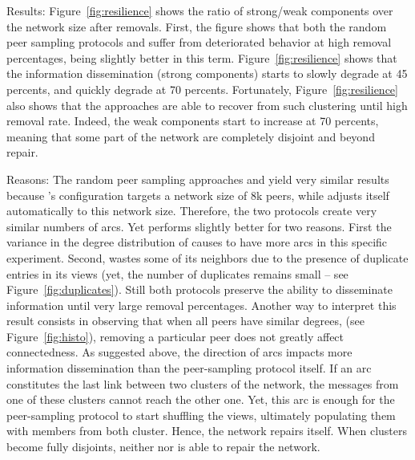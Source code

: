 \begin{asparadesc}
\item[Results:] Figure~\ref{fig:resilience} shows the ratio of strong/weak
  components over the network size after removals. First, the figure shows that
  both the random peer sampling protocols \SPRAY and \CYCLON suffer from
  deteriorated behavior at high removal percentages, \CYCLON being slightly
  better in this term. Figure~\ref{fig:resilience} shows that the information
  dissemination (strong components) starts to slowly degrade at 45 percents, and
  quickly degrade at 70 percents. Fortunately, Figure~\ref{fig:resilience} also
  shows that the approaches are able to recover from such clustering until high
  removal rate. Indeed, the weak components start to increase at 70 percents,
  meaning that some part of the network are completely disjoint and beyond
  repair.%
\item[Reasons:] The random peer sampling approaches \CYCLON and \SPRAY
  yield very similar results because \CYCLON's configuration targets a
  network size of 8k peers, while \SPRAY adjusts itself automatically
  to this network size.  Therefore, the two protocols create very
  similar numbers of arcs. Yet \CYCLON performs slightly better for
  two reasons. First the variance in the degree distribution of \SPRAY
  causes \CYCLON to have more arcs in this specific
  experiment. Second, \SPRAY wastes some of its neighbors due to the
  presence of duplicate entries in its views (yet, the number of
  duplicates remains small -- see Figure~\ref{fig:duplicates}). Still
  both protocols preserve the ability to disseminate information until
  very large removal percentages. Another way to interpret this result
  consists in observing that when all peers have similar degrees,
  (see Figure~\ref{fig:histo}), removing a particular peer does not
  greatly affect connectedness. As suggested above, the direction of
  arcs impacts more information dissemination than the peer-sampling
  protocol itself. If an arc constitutes the last link between two
  clusters of the network, the messages from one of these clusters
  cannot reach the other one. Yet, this arc is enough for the
  peer-sampling protocol to start shuffling the views, ultimately
  populating them with members from both cluster. Hence, the network
  repairs itself.  When clusters become fully disjoints, neither
  \CYCLON nor \SPRAY is able to repair the
  network.  %
\end{asparadesc}


